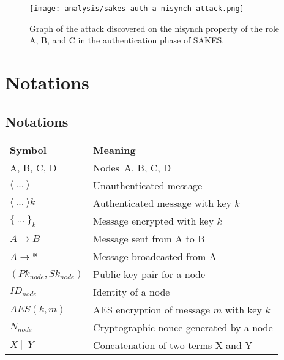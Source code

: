\begin{figure}[h]
	\centering
	\texttt{[image: analysis/sakes-auth-a-nisynch-attack.png]}
	\caption{Graph of the attack discovered on the nisynch property of the role A, B, and C in the authentication phase of SAKES.}
	\label{fig:sakes-attack-nisynch}
\end{figure}

\chapter{Notations}

\section{Notations}
\label{app:notations}

\begin{tcolorbox}[title=Notations used in protocol specifications]
\begin{tabular}{ll}
\multicolumn{1}{p{1.3cm}}{\textbf{Symbol}} & \multicolumn{1}{p{4cm}}{\textbf{Meaning}}\\
A, B, C, D & Nodes\ A, B, C, D\\
$\langle{\ ...\ }\rangle{}$ & Unauthenticated message\\
$\langle{\ ...\ }\rangle{k}$ & Authenticated message with key $k$\\
$\{\ ...\ \}_k$ & Message encrypted with key $k$\\
$A \rightarrow B$ & Message sent from A to B\\
$A \rightarrow *$ & Message broadcasted from A\\
$(Pk_{node}, Sk_{node})$ & Public key pair for a node \\
$ID_{node}$ & Identity of a node\\
$AES(k, m)$ & AES encryption of message $m$ with key $k$\\
$N_{node}$ & Cryptographic nonce generated by a node\\
$X\ ||\ Y$ & Concatenation of two terms X and Y\\ 
\end{tabular}
\end{tcolorbox}


